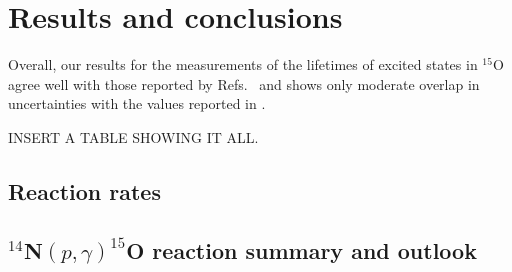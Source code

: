 %
%
%
%
%
%
%
%
%
%


%
%

\chapter{Results and conclusions}
\label{chap: conclusions}

Overall, our results for the measurements of the lifetimes of excited states in $^{15}$O agree well with those reported by Refs.\ \cite{Schurmann2008, Galinski2014, Michelagnoli2013} and shows only moderate overlap in uncertainties with the values reported in \cite{Bertone2001}.

INSERT A TABLE SHOWING IT ALL.

\section{Reaction rates}
\label{sec: rates}



\section{$^{14}$N$\left( p,\gamma \right) ^{15}$O reaction summary and outlook}
\label{sec: summary and outlook}


%
% 
% 
